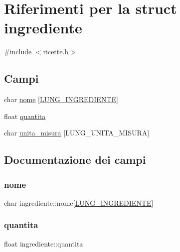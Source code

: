 \hypertarget{structingrediente}{}\section{Riferimenti per la struct ingrediente}
\label{structingrediente}


{\ttfamily \#include $<$ricette.\+h$>$}

\subsection*{Campi}
\begin{DoxyCompactItemize}
\item 
char \hyperlink{structingrediente_abc3e24e6f64482d852f4911224236939}{nome} \mbox{[}\hyperlink{ricette_8h_a4cfbc12da1c68bf747428d14ce5b1a24}{L\+U\+N\+G\+\_\+\+I\+N\+G\+R\+E\+D\+I\+E\+N\+TE}\mbox{]}
\item 
float \hyperlink{structingrediente_ad790202dff2ec007bdff02bb6d6635b0}{quantita}
\item 
char \hyperlink{structingrediente_ab434c5cb78713bf062a8729071d3bc0d}{unita\+\_\+misura} \mbox{[}L\+U\+N\+G\+\_\+\+U\+N\+I\+T\+A\+\_\+\+M\+I\+S\+U\+RA\mbox{]}
\end{DoxyCompactItemize}


\subsection{Documentazione dei campi}
\mbox{\label{structingrediente_abc3e24e6f64482d852f4911224236939}} 
\subsubsection{\texorpdfstring{nome}{nome}}
{\footnotesize\ttfamily char ingrediente\+::nome\mbox{[}\hyperlink{ricette_8h_a4cfbc12da1c68bf747428d14ce5b1a24}{L\+U\+N\+G\+\_\+\+I\+N\+G\+R\+E\+D\+I\+E\+N\+TE}\mbox{]}}

\mbox{\label{structingrediente_ad790202dff2ec007bdff02bb6d6635b0}} 
\subsubsection{\texorpdfstring{quantita}{quantita}}
{\footnotesize\ttfamily float ingrediente\+::quantita}

